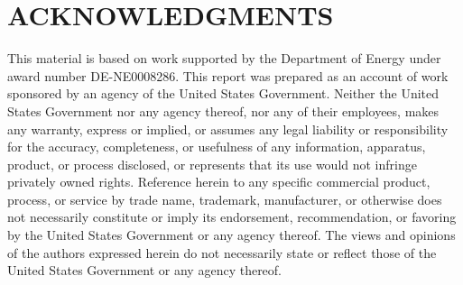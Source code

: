 \documentclass[12pt]{article}
\begin{document}
\section*{ACKNOWLEDGMENTS}

This material is based on work supported by the Department of Energy under award number DE-NE0008286. This report was prepared as an account of work sponsored by an agency of the United States Government. Neither the United States Government nor any agency thereof, nor any of their employees, makes any warranty, express or implied, or assumes any legal liability or responsibility for the accuracy, completeness, or usefulness of any information, apparatus, product, or process disclosed, or represents that its use would not infringe privately owned rights. Reference herein to any specific commercial product, process, or service by trade name, trademark, manufacturer, or otherwise does not necessarily constitute or imply its endorsement, recommendation, or favoring by the United States Government or any agency thereof. The views and opinions of the authors expressed herein do not necessarily state or reflect those of the United States Government or any agency thereof.




\appendix

\makeatletter

\makeatother
\end{document}
